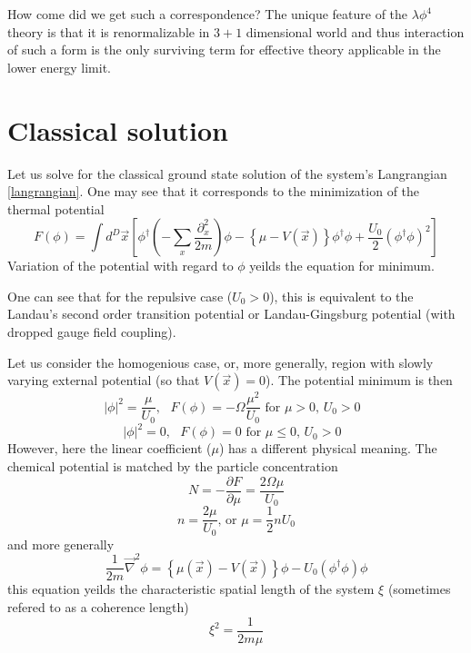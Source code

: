 \documentclass[8pt,letterpaper,notitlepage]{article}
\begin{document}
How come did we get such a correspondence? The unique feature of the $\lambda \phi^4$ theory is that it is renormalizable in $3+1$ dimensional world and thus interaction of such a form is the only surviving term for effective theory applicable in the lower energy limit.  

\section{Classical solution}
Let us solve for the classical ground state solution of the system's Langrangian \ref{langrangian}. One may see that it corresponds to the minimization of the thermal potential 
\begin{equation}
F(\phi) = \int d^D\vec{x} \left[  \phi^{\dagger} \left( - \sum_x \frac{\partial_x^2}{2 m} \right)
\phi - \left\{ \mu - V(\vec{x}) \right\} \phi^{\dagger} \phi + \frac{U_0}{2} ( \phi^{\dagger} \phi )^2
\right]
\end{equation}
Variation of the potential with regard to $\phi$ yeilds the equation for minimum.

One can see that for the repulsive case ($U_0 > 0$), this is equivalent to the Landau's second order transition potential or Landau-Gingsburg potential (with dropped gauge field coupling).

Let us consider the homogenious case, or, more generally, region with slowly varying external potential (so that $V(\vec{x}) = 0$). The potential minimum is then
\begin{equation}
| \phi |^2= \frac{\mu}{U_0},\textrm{  } F(\phi) = - \Omega \frac{\mu^2}{U_0}  \textrm{ for $\mu>0$, $U_0> 0$ }
\end{equation}
\begin{equation}
| \phi |^2= 0, \textrm{  } F(\phi) = 0 \textrm{ for $\mu \leq 0$, $U_0> 0$ }
\end{equation}
However, here the linear coefficient ($\mu$) has a different physical meaning. The chemical potential is matched by the particle concentration
\begin{equation}
N = - \frac{\partial F}{\partial \mu} = \frac{2 \Omega \mu}{U_0}
\end{equation}
\begin{equation}
n = \frac{2 \mu}{U_0} \textrm{, or } \mu = \frac{1}{2} n U_0
\end{equation}
and more generally
\begin{equation}
\frac{1}{2m} \vec{\nabla}^2 \phi = \left\{ \mu (\vec{x}) - V(\vec{x}) \right\} \phi - U_0 ( \phi^{\dagger} \phi ) \phi
\end{equation}
this  equation yeilds the characteristic spatial length of the system $\xi$ (sometimes refered to as a coherence length)
\begin{equation}
\xi^2 = \frac{1}{2 m \mu}
\end{equation}
\end{document}
